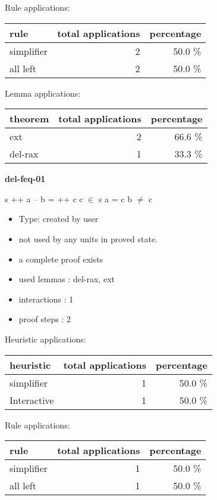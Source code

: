 \documentclass[a4paper]{article}
\begin{document}
Rule applications:

\begin{supertabular}{l|r|r}
rule	        & total applications & percentage \\ \hline
simplifier & 2 & 50.0 \% \\
all left & 2 & 50.0 \% \\

\end{supertabular}

Lemma applications:

\begin{supertabular}{l|r|r}
theorem	        & total applications & percentage \\ \hline
ext & 2 & 66.6 \% \\
del-rax & 1 & 33.3 \% \\

\end{supertabular}
\pagebreak

{\LARGE\bf del-feq-01}\label{lemma-del-feq-01}

\medskip

 \Fol s ++ a -- b =  ++ c \And \Not c $\in$ s \Imp a = c \And b $\neq$ c

\begin{itemize}

\item Type: created by user

\item not used by any units in proved state.
\item       a complete proof exists
\item       used lemmas  : del-rax, ext
\item       interactions : 1
\item       proof steps  : 2
\end{itemize}

\medskip


Heuristic applications:

\begin{supertabular}{l|r|r}
heuristic	& total applications & percentage \\ \hline
simplifier & 1 & 50.0 \% \\
Interactive & 1 & 50.0 \% \\

\end{supertabular}

Rule applications:

\begin{supertabular}{l|r|r}
rule	        & total applications & percentage \\ \hline
simplifier & 1 & 50.0 \% \\
all left & 1 & 50.0 \% \\

\end{supertabular}
\end{document}
